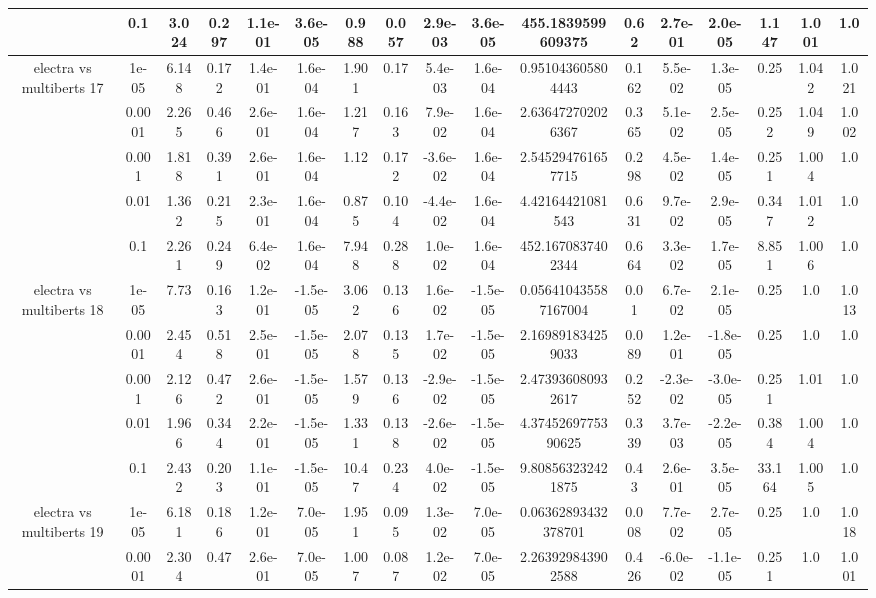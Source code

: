 \begin{tabular}{|c|c|c|c|c|c|c|c|c|c|c|c|c|c|c|c|c|}
 & 0.1 & 3.024 & 0.297 & 1.1e-01 & 3.6e-05 & 0.988 & 0.057 & 2.9e-03 & 3.6e-05 & 455.1839599609375 & 0.62 & 2.7e-01 & 2.0e-05 & 1.147 & 1.001 & 1.0 \\
\hline
\multirow{5}{*}{electra  vs multiberts 17} & 1e-05 & 6.148 & 0.172 & 1.4e-01 & 1.6e-04 & 1.901 & 0.17 & 5.4e-03 & 1.6e-04 & 0.951043605804443 & 0.162 & 5.5e-02 & 1.3e-05 & 0.25 & 1.042 & 1.021 \\
 & 0.0001 & 2.265 & 0.466 & 2.6e-01 & 1.6e-04 & 1.217 & 0.163 & 7.9e-02 & 1.6e-04 & 2.636472702026367 & 0.365 & 5.1e-02 & 2.5e-05 & 0.252 & 1.049 & 1.002 \\
 & 0.001 & 1.818 & 0.391 & 2.6e-01 & 1.6e-04 & 1.12 & 0.172 & -3.6e-02 & 1.6e-04 & 2.545294761657715 & 0.298 & 4.5e-02 & 1.4e-05 & 0.251 & 1.004 & 1.0 \\
 & 0.01 & 1.362 & 0.215 & 2.3e-01 & 1.6e-04 & 0.875 & 0.104 & -4.4e-02 & 1.6e-04 & 4.42164421081543 & 0.631 & 9.7e-02 & 2.9e-05 & 0.347 & 1.012 & 1.0 \\
 & 0.1 & 2.261 & 0.249 & 6.4e-02 & 1.6e-04 & 7.948 & 0.288 & 1.0e-02 & 1.6e-04 & 452.1670837402344 & 0.664 & 3.3e-02 & 1.7e-05 & 8.851 & 1.006 & 1.0 \\
\hline
\multirow{5}{*}{electra  vs multiberts 18} & 1e-05 & 7.73 & 0.163 & 1.2e-01 & -1.5e-05 & 3.062 & 0.136 & 1.6e-02 & -1.5e-05 & 0.056410435587167004 & 0.01 & 6.7e-02 & 2.1e-05 & 0.25 & 1.0 & 1.013 \\
 & 0.0001 & 2.454 & 0.518 & 2.5e-01 & -1.5e-05 & 2.078 & 0.135 & 1.7e-02 & -1.5e-05 & 2.169891834259033 & 0.089 & 1.2e-01 & -1.8e-05 & 0.25 & 1.0 & 1.0 \\
 & 0.001 & 2.126 & 0.472 & 2.6e-01 & -1.5e-05 & 1.579 & 0.136 & -2.9e-02 & -1.5e-05 & 2.473936080932617 & 0.252 & -2.3e-02 & -3.0e-05 & 0.251 & 1.01 & 1.0 \\
 & 0.01 & 1.966 & 0.344 & 2.2e-01 & -1.5e-05 & 1.331 & 0.138 & -2.6e-02 & -1.5e-05 & 4.3745269775390625 & 0.339 & 3.7e-03 & -2.2e-05 & 0.384 & 1.004 & 1.0 \\
 & 0.1 & 2.432 & 0.203 & 1.1e-01 & -1.5e-05 & 10.47 & 0.234 & 4.0e-02 & -1.5e-05 & 9.808563232421875 & 0.43 & 2.6e-01 & 3.5e-05 & 33.164 & 1.005 & 1.0 \\
\hline
\multirow{5}{*}{electra  vs multiberts 19} & 1e-05 & 6.181 & 0.186 & 1.2e-01 & 7.0e-05 & 1.951 & 0.095 & 1.3e-02 & 7.0e-05 & 0.06362893432378701 & 0.008 & 7.7e-02 & 2.7e-05 & 0.25 & 1.0 & 1.018 \\
 & 0.0001 & 2.304 & 0.47 & 2.6e-01 & 7.0e-05 & 1.007 & 0.087 & 1.2e-02 & 7.0e-05 & 2.263929843902588 & 0.426 & -6.0e-02 & -1.1e-05 & 0.251 & 1.0 & 1.001 \\

\end{tabular}

